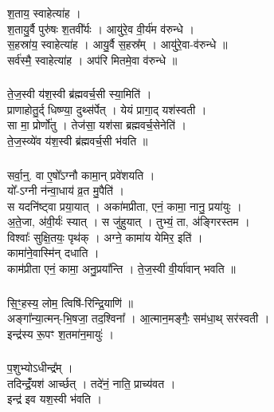\subsubsection{}
श॒ताय॒ स्वाहेत्या॑ह ।\\
श॒तायु॒र्वै पुरु॑षः श॒तवी᳚र्यः । आयु॑रे॒व वी॒र्य॑म व॑रुन्धे ।\\
स॒हस्रा॑य॒ स्वाहेत्या॑ह । आयु॒र्वै स॒हस्र᳚म् । आयु॑रे॒वा-व॑रुन्धे ॥\\
सर्व॑स्मै॒ स्वाहेत्या॑ह । अप॑रि मितमे॒वा व॑रुन्धे ॥\\
\subsubsection{}
ते॒ज॒स्वी य॑श॒स्वी ब्र॑ह्मवर्च॒सी स्या॒मिति॑ ।\\
प्राणाहोतु॒र्द् धिष्ण्या॒ दुथ्स॑र्पेत् । येयं प्रागा॒द् यश॑स्वती ।\\
सा मा॒ प्रोर्णो॑तु । तेज॑सा॒ यश॑सा ब्रह्मवर्च॒सेनेति॑ ।\\
ते॒ज॒स्व्ये॑व य॑श॒स्वी ब्र॑ह्मवर्च॒सी भ॑वति ॥\\
\subsubsection{}
सर्वा॒न्॒. वा ए॒षो᳚ऽग्नौ कामा॒न् प्रवे॑शयति ।\\
यो᳚-ऽग्नी न॑न्वा॒धाय॑ व्र॒त मु॒पैति॑ ।\\
स यदनि॑ष्ट्वा प्रया॒यात् । अका॑मप्रीता, एनं॒ कामा॒ नानु॒ प्रया॑युः ।\\
अ॒ते॒जा, अ॑वी॒र्यः॑ स्यात् । स जु॑हुयात् । तुभ्यं॒ ता, अ॑ङ्गिरस्तम ।\\
विश्वाः᳚ सुक्षि॒तयः॒ पृथ॑क् । अग्ने॒ कामा॑य येमिर॒ इति॑ ।\\
कामा॑ने॒वास्मि॑न् दधाति ।\\
काम॑प्रीता एनं॒ कामा॒ अनु॒प्रया᳚न्ति । ते॒ज॒स्वी वी॒र्या॑वान् भवति ॥\\
\subsubsection{}
सि॒ꣳ॒हस्य॒ लोम॒ त्विषि॑-रिन्द्रि॒याणि॑ ॥\\
अङ्गा᳚न्या॒त्मन्-भि॒षजा॒ तद॒श्विना᳚ । आ॒त्मान॒मङ्गैः॒ सम॑धा॒थ् सर॑स्वती ।\\
इन्द्र॑स्य रू॒पꣳ श॒तमा॑न॒मायुः॑ ।\\
\subsubsection{}
प॒शुभ्योऽधीन्द्र᳚म् ।\\
तदिन्द्रंँ॒यश॑ आर्च्छत् । तदे॑नं॒ नाति॒ प्राच्य॑वत ।\\
इन्द्र॑ इव यश॒स्वी भ॑वति ।\\
